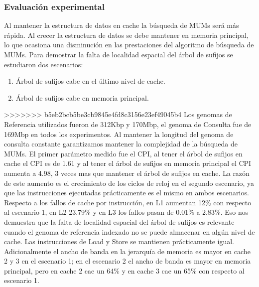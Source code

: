 \documentclass[12pt,a4paper]{article}
\begin{document}
\subsubsection{Evaluación experimental}
\indent
Al mantener la estructura de datos en cache la búsqueda de MUMs será más rápida. Al crecer la estructura de datos se debe mantener en memoria principal, lo que ocasiona una disminución en las prestaciones del algoritmo de búsqueda de MUMs.
Para demostrar la falta de localidad espacial del árbol de sufijos se estudiaron dos escenarios:
\begin{enumerate}
\item Árbol de sufijos cabe en el último nivel de cache.
\item Árbol de sufijos cabe en memoria principal.
\end{enumerate}
>>>>>>> b5eb2bcb5be3cb9845e4fd8c3156e23ef49045b4
Los genomas de Referencia utilizados fueron de 312Kbp y 170Mbp, el genoma de Consulta fue de 169Mbp en todos los experimentos. Al mantener la longitud del genoma de consulta constante garantizamos mantener la complejidad de la búsqueda de MUMs.
El primer parámetro medido fue el CPI, al tener el árbol de sufijos en cache el CPI es de 1.61 y al tener el árbol de sufijos en memoria principal el CPI aumenta a 4.98, 3 veces mas que mantener el árbol de sufijos en cache. La razón de este aumento es el crecimiento de los ciclos de reloj en el segundo escenario, ya que las instrucciones ejecutadas prácticamente es el mismo en ambos escenarios.
Respecto a los fallos de cache por instrucción, en L1 aumentan 12\% con respecto al escenario 1, en L2 23.79\% y en L3 los fallos pasan de 0.01\% a 2.83\%. Eso nos demuestra que la falta de localidad espacial del árbol de sufijos es relevante cuando el genoma de referencia indexado no se puede almacenar en algún nivel de cache. Las instrucciones de Load y Store se mantienen prácticamente igual. Adicionalmente el ancho de banda en la jerarquía de memoria es mayor en cache 2 y 3 en el escenario 1; en el escenario 2 el ancho de banda es mayor en memoria principal, pero en cache 2 cae un 64\% y en cache 3 cae un 65\% con respecto al escenario 1.
\end{document}
